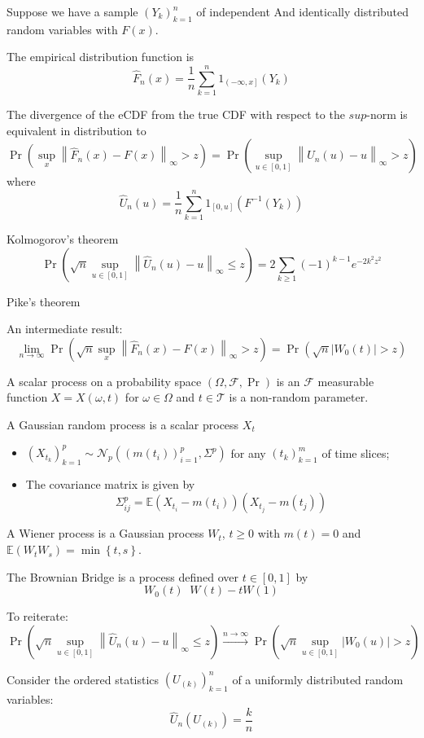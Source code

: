 \documentclass[a4paper]{article}
\newcommand{\obj}[1]{{\left\{ #1 \right \}}}
\newcommand{\clo}[1]{{\left [ #1 \right ]}}
\newcommand{\ploc}[1]{{\left ( #1 \right ]}}
\newcommand{\brac}[1]{{\left ( #1 \right )}}
\newcommand{\abs}[1]{{\left | #1 \right |}}
\newcommand{\nrm}[1]{{\left\| #1 \right \|}}
\newcommand{\Fcal}{\mathcal{F}}
\newcommand{\Tcal}{\mathcal{T}}
\newcommand{\Ncal}{\mathcal{N}}
\newcommand{\ex}{\mathbb{E}}
\newcommand{\defn}{\mathop{\overset{\Delta}{=}}\nolimits}
\begin{document}
Suppose we have a sample  $\brac{Y_k}_{k=1}^n$ of independent And identically distributed random variables with $F(x)$.

The empirical distribution function is
\[\hat{F}_n(x) = \frac{1}{n}\sum_{k=1}^n 1_{\ploc{-\infty, x}}(Y_k)\]

The divergence of the eCDF from the true CDF with respect to the $
sup$-norm is equivalent in distribution to
\[\Pr\brac{\sup_{x}\nrm{\hat{F}_n(x) - F(x)}_\infty > z} = \Pr\brac{\sup_{u\in\clo{0,1}}\nrm{\hat{U}_n(u) - u}_\infty > z}\]
where 
\[\hat{U}_n(u) = \frac{1}{n}\sum_{k=1}^n 1_{\clo{0, u}}\brac{F^{-1}(Y_k)}\]

Kolmogorov's theorem
\[\Pr\brac{\sqrt{n} \sup_{u\in\clo{0,1}}\nrm{\hat{U}_n(u) - u}_\infty \leq z} = 2\sum_{k\geq1} {(-1)}^{k-1} e^{-2 k^2 z^2}\]


Pike's theorem


An intermediate result:
\[\lim_{n\to \infty} \Pr\brac{\sqrt{n} \sup_{x}\nrm{\hat{F}_n(x) - F(x)}_\infty > z} = \Pr\brac{\sqrt{n} \abs{W_0(t)} > z}\]

A scalar process on a probability space $\brac{\Omega, \Fcal, \Pr}$ is an $\Fcal$ measurable function $X = X(\omega, t)$ for $\omega\in \Omega$ and $t\in \Tcal$ is a non-random parameter.

A Gaussian random process is a scalar process $X_t$ \begin{itemize}
	\item $\brac{X_{t_k}}_{k=1}^p\sim \Ncal_p\brac{\brac{m(t_i)}_{i=1}^p, \Sigma^p}$ for any $\brac{t_k}_{k=1}^m$ of time slices;
	\item The covariance matrix is given by 
	\[\Sigma^p_{ij} = \ex\brac{X_{t_i} - m(t_i)}\brac{X_{t_j} - m(t_j)}\]
\end{itemize}

A Wiener process is a Gaussian process $W_t$, $t\geq 0$ with $m(t) = 0$ and $\ex\brac{W_t W_s} = \min\obj{t,s}$.

The Brownian Bridge is a process defined over $t\in\clo{0,1}$ by
\[W_0(t) \defn W(t) - t W(1)\]

To reiterate:
\[\Pr\brac{\sqrt{n} \sup_{u\in\clo{0,1}} \nrm{\hat{U}_n(u) - u}_\infty \leq z} \overset{n\to\infty}{\to} \Pr\brac{\sqrt{n} \sup_{u\in \clo{0,1}}\abs{W_0(u)} > z}\]

Consider the ordered statistics $\brac{U_{(k)}}_{k=1}^n$ of a uniformly distributed random variables:
\[\hat{U}_n(U_{(k)}) = \frac{k}{n}\]
\end{document}
